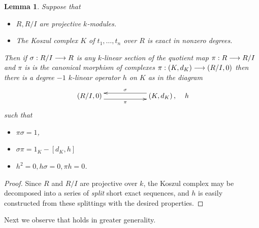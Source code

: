 \documentclass[english,letter paper,12pt,leqno]{article}
\newtheorem{lemma}[theorem]{Lemma}
\theoremstyle{example}
\numberwithin{equation}{section}
\begin{document}
\begin{lemma}\label{lemma:trivialsplit} Suppose that
\begin{itemize}
\item[(i)] $R, R/I$ are projective $k$-modules.
\item[(ii)] The Koszul complex $K$ of $t_1,\ldots,t_n$ over $R$ is exact in nonzero degrees.
\end{itemize}
Then if $\sigma: R/I \longrightarrow R$ is any $k$-linear section of the quotient map $\pi: R \longrightarrow R/I$ and $\pi$ is is the canonical morphism of complexes $\pi: (K,d_K) \longrightarrow (R/I,0)$ then there is a degree $-1$ $k$-linear operator $h$ on $K$ as in the diagram
\[
\xymatrix@C+3pc{
(R/I,0) \ar@<-1ex>[r]_-\pi & (K,d_K)\,, \ar@<-1ex>[l]_-\sigma
}\quad h
\]
such that
\begin{itemize}
\item $\pi \sigma = 1$,
\item $\sigma \pi = 1_K - [d_K, h]$
\item $h^2 = 0, h\sigma = 0, \pi h = 0$.
\end{itemize}
\end{lemma}
\begin{proof}
Since $R$ and $R/I$ are projective over $k$, the Koszul complex may be decomposed into a series of \emph{split} short exact sequences, and $h$ is easily constructed from these splittings with the desired properties.
\end{proof}

Next we observe that \cite[Remark 7.7]{pushforward} holds in greater generality. %
\end{document}
